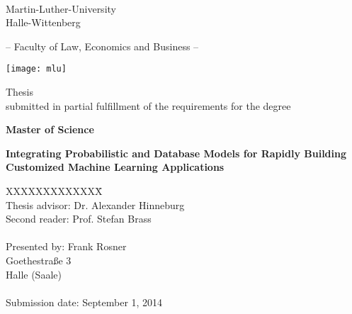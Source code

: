 \label{Titelseite}

\begin{titlepage}
\begin{center}

\ 

\vspace{2\baselineskip}

Martin-Luther-University\\
Halle-Wittenberg

\vspace{\baselineskip}

-- Faculty of Law, Economics and Business --

\vspace{\baselineskip}

\texttt{[image: mlu]}

\vspace{2\baselineskip}

Thesis\\
submitted in partial fulfillment of the requirements for the degree

\textbf{Master of Science}

\vspace{2\baselineskip}

\renewcommand{\baselinestretch}{1.4}\normalsize
\textbf{\Large{Integrating Probabilistic and Database Models for Rapidly Building Customized Machine Learning Applications}}

\renewcommand{\baselinestretch}{1.00}\normalsize
\vspace{\baselineskip}

\vspace*{2\baselineskip}

\parbox{0cm}{
\begin{tabbing}
XXXXXXXXXXXXX\= \kill \\ 
Thesis advisor:\> Dr. Alexander Hinneburg\\
Second reader:\> Prof. Stefan Brass\\
\\
Presented by:
\> Frank Rosner\\
\> Goethestraße 3\\
 Halle (Saale)\\
\\
Submission date: \>September 1, 2014
\end{tabbing}}

\end{center}
\end{titlepage}
